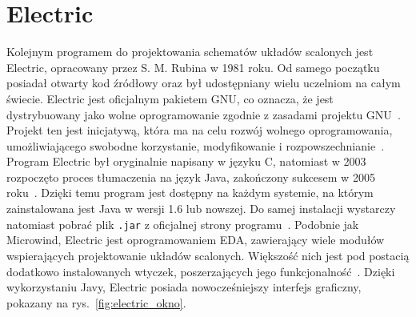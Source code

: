 \section{Electric}

Kolejnym programem do projektowania schematów układów scalonych jest Electric,
opracowany przez S. M. Rubina w 1981 roku.
Od samego początku posiadał otwarty kod źródłowy
oraz był udostępniany wielu uczelniom na całym świecie.
Electric jest oficjalnym pakietem GNU, co oznacza,
że jest dystrybuowany jako wolne oprogramowanie zgodnie z zasadami projektu GNU~\cite{electric_gnu}.
Projekt ten jest inicjatywą, która ma na celu rozwój wolnego oprogramowania,
umożliwiającego swobodne korzystanie, modyfikowanie i rozpowszechnianie~\cite{gnu_site}.
Program Electric był oryginalnie napisany w języku C,
natomiast w 2003 rozpoczęto proces tłumaczenia na język Java, zakończony sukcesem w 2005 roku~\cite{electric_gnu}.
Dzięki temu program jest dostępny na każdym systemie,
na którym zainstalowana jest Java w wersji 1.6 lub nowszej.
Do samej instalacji wystarczy natomiast pobrać plik \texttt{.jar} z oficjalnej strony programu~\cite{electric_sfs}.
Podobnie jak Microwind, Electric jest oprogramowaniem EDA, zawierający wiele modułów wspierających projektowanie układów scalonych.
Większość nich jest pod postacią dodatkowo instalowanych wtyczek,
poszerzających jego funkcjonalność~\cite{electric_sfs, electric_gnu}.
Dzięki wykorzystaniu Javy, Electric posiada nowocześniejszy interfejs graficzny,
pokazany na rys.~\ref{fig:electric_okno}.

